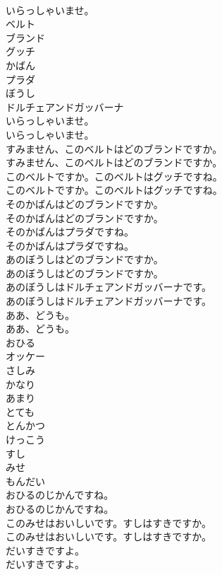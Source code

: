 \documentclass[8pt]{extreport}
\begin{document}
\begin{CJK}{UTF8}{min}
\\	いらっしゃいませ。
\\	ベルト
\\	ブランド
\\	グッチ
\\	かばん
\\	プラダ
\\	ぼうし
\\	ドルチェアンドガッバーナ
\\	いらっしゃいませ。	
\\	いらっしゃいませ。 
\\	すみません、このベルトはどのブランドですか。	
\\	すみません、このベルトはどのブランドですか。 
\\	このベルトですか。このベルトはグッチですね。	
\\	このベルトですか。このベルトはグッチですね。 
\\	そのかばんはどのブランドですか。	
\\	そのかばんはどのブランドですか。 
\\	そのかばんはプラダですね。	
\\	そのかばんはプラダですね。 
\\	あのぼうしはどのブランドですか。	
\\	あのぼうしはどのブランドですか。 
\\	あのぼうしはドルチェアンドガッバーナです。	
\\	あのぼうしはドルチェアンドガッバーナです。 
\\	ああ、どうも。	
\\	ああ、どうも。 
\\	おひる
\\	オッケー
\\	さしみ
\\	かなり
\\	あまり
\\	とても
\\	とんかつ
\\	けっこう
\\	すし
\\	みせ
\\	もんだい
\\	おひるのじかんですね。	
\\	おひるのじかんですね。 
\\	このみせはおいしいです。すしはすきですか。	
\\	このみせはおいしいです。すしはすきですか。 
\\	だいすきですよ。	
\\	だいすきですよ。 

\end{CJK}
\end{document}
